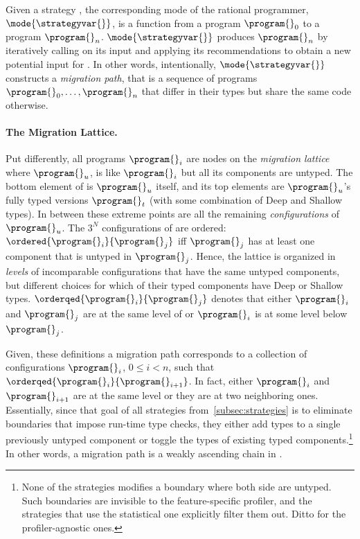 
Given a strategy \strategyvar{}, the corresponding mode of the rational
programmer, $\mode{\strategyvar{}}$, is a function from a program $\program{}_0$
to a program $\program{}_n$. $\mode{\strategyvar{}}$ produces $\program{}_n$ by
iteratively calling \strategyvar{} on its input and applying its recommendations
to obtain a new potential input for \strategyvar{}.  In other words,
intentionally, $\mode{\strategyvar{}}$ constructs a \emph{migration path}, that
is a sequence of programs ${\program{}_0}, \ldots, {\program{}_n}$ that differ in
their types but share the same code otherwise.

\paragraph{The Migration Lattice.}
Put differently, all programs $\program{}_i$ are nodes on the
\emph{migration lattice}  where ${\program{}_u}$, is
like ${\program{}_i}$ but all its components are untyped. The bottom
element of  is ${\program{}_u}$ itself, and its top
elements are ${\program{}_u}$'s fully typed versions $\program{}_t$ (with some
combination of Deep and Shallow types). In between these extreme points
are all the remaining \emph{configurations} of $\program{}_u$. The $3^N$
configurations of   are ordered:
$\ordered{\program{}_i}{\program{}_j}$ iff $\program{}_j$ has at least one
component that is untyped in $\program{}_j$. Hence, the lattice is
organized in \emph{levels} of incomparable configurations that have the same
untyped components, but different choices for which of their typed
components have Deep or Shallow types.
$\orderqed{\program{}_i}{\program{}_j}$ denotes that either $\program{}_i$
and $\program{}_j$ are at the same level of  or
$\program{}_i$ is at some level below $\program{}_j$.

Given, these definitions a migration path corresponds to a collection of
configurations  $\program{}_i$, $0 \leq  i < n$, such that
$\orderqed{\program{}_i}{\program{}_{i+1}}$. In fact, either  $\program{}_i$
and $\program{}_{i+1}$ are at the same level or they are at two
neighboring ones.  Essentially, since that goal of all strategies
from~\ref{subsec:strategies} is to eliminate  boundaries that impose
run-time type checks, they either add types to a single previously
untyped component or toggle the types of existing typed
components.\footnote{None of the strategies modifies a boundary where both
side are untyped. Such boundaries are invisible to the feature-specific
profiler, and the strategies that use the statistical one explicitly
filter them out. Ditto for the profiler-agnostic ones.} 
In other words, a migration path is a weakly ascending
chain in .

